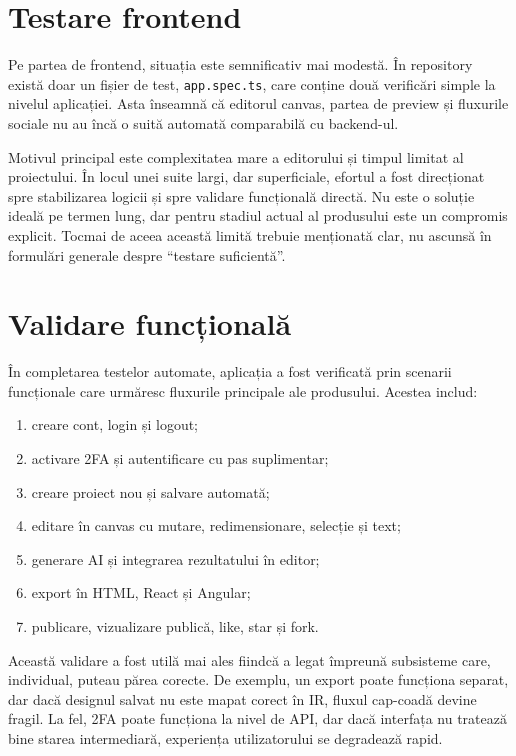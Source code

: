 \section{Testare frontend}

Pe partea de frontend, situația este semnificativ mai modestă. În repository există doar un fișier de test, \texttt{app.spec.ts}, care conține două verificări simple la nivelul aplicației. Asta înseamnă că editorul canvas, partea de preview și fluxurile sociale nu au încă o suită automată comparabilă cu backend-ul.

Motivul principal este complexitatea mare a editorului și timpul limitat al proiectului. În locul unei suite largi, dar superficiale, efortul a fost direcționat spre stabilizarea logicii și spre validare funcțională directă. Nu este o soluție ideală pe termen lung, dar pentru stadiul actual al produsului este un compromis explicit. Tocmai de aceea această limită trebuie menționată clar, nu ascunsă în formulări generale despre ``testare suficientă''.

\section{Validare funcțională}

În completarea testelor automate, aplicația a fost verificată prin scenarii funcționale care urmăresc fluxurile principale ale produsului. Acestea includ:

\begin{enumerate}[leftmargin=1.5cm]
  \item creare cont, login și logout;
  \item activare 2FA și autentificare cu pas suplimentar;
  \item creare proiect nou și salvare automată;
  \item editare în canvas cu mutare, redimensionare, selecție și text;
  \item generare AI și integrarea rezultatului în editor;
  \item export în HTML, React și Angular;
  \item publicare, vizualizare publică, like, star și fork.
\end{enumerate}

Această validare a fost utilă mai ales fiindcă a legat împreună subsisteme care, individual, puteau părea corecte. De exemplu, un export poate funcționa separat, dar dacă designul salvat nu este mapat corect în IR, fluxul cap-coadă devine fragil. La fel, 2FA poate funcționa la nivel de API, dar dacă interfața nu tratează bine starea intermediară, experiența utilizatorului se degradează rapid.

